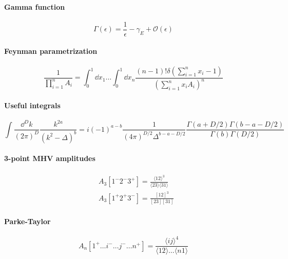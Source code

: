 
\paragraph{Gamma function}
\begin{equation}
\Gamma(\epsilon) = \frac{1}{\epsilon} - \gamma_E + \mathcal{O}(\epsilon)
\end{equation}

\paragraph{Feynman parametrization}
\begin{equation}
\frac{1}{\prod_{i=1}^n A_i} = \int_0^1 \dd x_1 \ldots\int^1_0\dd x_n\frac{(n-1)!\delta(\sum_{i=1}^n x_i -1)}{(\sum_{i=1}^n x_i A_i)^n}
\end{equation}

\paragraph{Useful integrals}
\begin{equation}
\int\frac{\dd^D k}{(2\pi)^D}\frac{k^{2a}}{(k^2-\Delta)^b} = i(-1)^{a-b}\frac{1}{(4\pi)^{D/2}\Delta^{b-a-D/2}}\frac{\Gamma(a+D/2)\Gamma(b-a-D/2)}{\Gamma(b)\Gamma(D/2)}
\end{equation}

\paragraph{3-point MHV amplitudes}
\begin{equation}
\begin{split}
& A_3[1^-2^-3^+] = \frac{\langle 1 2 \rangle^3}{\langle 23 \rangle \langle 31 \rangle}
\\
& A_3[1^+2^+3^-] = \frac{[12]^3}{[23][31]}
\end{split}
\end{equation}
\paragraph{Parke-Taylor}
\begin{equation}
A_n[1^+\ldots i^-\ldots j^-\ldots n^+] = \frac{\langle i j \rangle^4}{\langle 12\rangle \ldots\langle n 1 \rangle}
\end{equation}